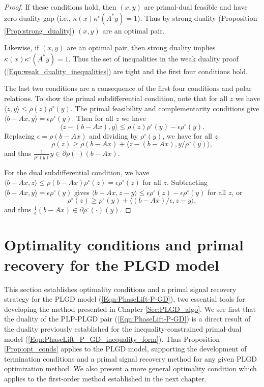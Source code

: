 \begin{proof}
If these conditions hold, then $(x, y)$ are primal-dual feasible and have zero duality gap (i.e., $\kappa(x) \kappa^\circ(A^*y) =1$).  Thus by strong duality (Proposition \ref{Prop:strong_duality}) $(x, y)$ are an optimal pair.

Likewise, if $(x, y)$ are an optimal pair, then strong duality implies $\kappa(x) \kappa^\circ(A^*y) = 1$.  Thus the set of inequalities in the weak duality proof (\ref{Eqn:weak_duality_inequalities}) are tight and the first four conditions hold.  

The last two conditions are a consequence of the first four conditions and polar relations.  To show the primal subdifferential condition, note that for all $z$ we have $\langle z, y \rangle \leq \rho(z) \rho^\circ(y)$.  The primal feasibility and complementarity conditions give $\langle b - Ax, y \rangle = \epsilon \rho^\circ(y)$.  Then for all $z$ we have
\[
\langle z - (b-Ax), y \rangle \leq \rho(z) \rho^\circ(y) - \epsilon \rho^\circ(y).
\]
Replacing $\epsilon = \rho(b-Ax)$ and dividing by $\rho^\circ(y)$, we have for all $z$
\[
\rho(z) \geq \rho(b-Ax) + \langle z - (b-Ax), y/\rho^\circ(y)\rangle,
\]
and thus $\frac{1}{\rho^\circ(y)}y	\in \partial \rho(\cdot) (b-Ax)$.

For the dual subdifferential condition, we have $\langle b - Ax, z \rangle \leq \rho(b-Ax) \rho^\circ(z) = \epsilon \rho^\circ(z)$ for all $z$.  Subtracting $\langle b - Ax, y \rangle = \epsilon \rho^\circ(y)$ gives $\langle b-Ax, z-y \rangle \leq \epsilon \rho^\circ(z) - \epsilon \rho^\circ(y)$ for all $z$, or
\[
\rho^\circ(z) \geq \rho^\circ(y) + \langle(b-Ax)/\epsilon, z-y\rangle,
\]
and thus $\frac{1}{\epsilon}(b - Ax) \in \partial \rho^\circ(\cdot) (y)$.


\end{proof}








\section{Optimality conditions and primal recovery for the PLGD model}   \label{Subsec:PLGD-opt_conds_primal_recovery}



This section establishes optimality conditions and a primal signal recovery strategy for the PLGD model (\ref{Eqn:PhaseLift-P-GD}), two essential tools for developing the method presented in Chapter \ref{Sec:PLGD_algo}.  We see first that the duality of the PLP-PLGD pair (\ref{Eqn:PhaseLift-P-GD}) is a direct result of the duality previously established for the inequality-constrained primal-dual model (\ref{Eqn:PhaseLift_P_GD_inequality_form}).  Thus Proposition \ref{Prop:opt_conds} applies to the PLGD model, supporting the development of termination conditions and a primal signal recovery method for any given PLGD optimization method.  We also present a more general optimality condition which applies to the first-order method established in the next chapter.





